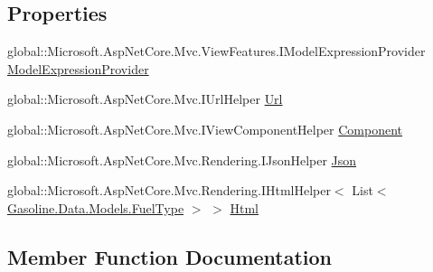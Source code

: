 \subsection*{Properties}
\begin{DoxyCompactItemize}
\item 
global\+::\+Microsoft.\+Asp\+Net\+Core.\+Mvc.\+View\+Features.\+I\+Model\+Expression\+Provider \mbox{\hyperlink{class_asp_net_core_1_1_views___home___all_fuels_view_a9b0c926d475c3a11c911f23c8664dcdc}{Model\+Expression\+Provider}}
\item 
global\+::\+Microsoft.\+Asp\+Net\+Core.\+Mvc.\+I\+Url\+Helper \mbox{\hyperlink{class_asp_net_core_1_1_views___home___all_fuels_view_a77e9731d911c76c4b3603ddbabe53626}{Url}}
\item 
global\+::\+Microsoft.\+Asp\+Net\+Core.\+Mvc.\+I\+View\+Component\+Helper \mbox{\hyperlink{class_asp_net_core_1_1_views___home___all_fuels_view_a35c5a53e65971cfc60a4cfa1d2559cfc}{Component}}
\item 
global\+::\+Microsoft.\+Asp\+Net\+Core.\+Mvc.\+Rendering.\+I\+Json\+Helper \mbox{\hyperlink{class_asp_net_core_1_1_views___home___all_fuels_view_a3a98cb70b0ab5b8b55463cd87135ed96}{Json}}
\item 
global\+::\+Microsoft.\+Asp\+Net\+Core.\+Mvc.\+Rendering.\+I\+Html\+Helper$<$ List$<$ \mbox{\hyperlink{class_gasoline_1_1_data_1_1_models_1_1_fuel_type}{Gasoline.\+Data.\+Models.\+Fuel\+Type}} $>$ $>$ \mbox{\hyperlink{class_asp_net_core_1_1_views___home___all_fuels_view_aae98f51af2d8f72f30b7afff7a1f1563}{Html}}
\end{DoxyCompactItemize}


\subsection{Member Function Documentation}
\mbox{\label{class_asp_net_core_1_1_views___home___all_fuels_view_a2f1c791398d0456876e91246e6e4e71a}} 
